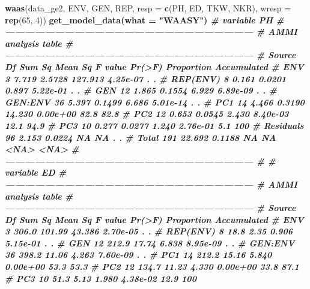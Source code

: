 \documentclass[
]{book}
\newenvironment{Shaded}{\begin{snugshade}}{\end{snugshade}}
\newcommand{\CommentTok}[1]{\textcolor[rgb]{0.56,0.35,0.01}{\textit{#1}}}
\newcommand{\DataTypeTok}[1]{\textcolor[rgb]{0.13,0.29,0.53}{#1}}
\newcommand{\DecValTok}[1]{\textcolor[rgb]{0.00,0.00,0.81}{#1}}
\newcommand{\KeywordTok}[1]{\textcolor[rgb]{0.13,0.29,0.53}{\textbf{#1}}}
\newcommand{\NormalTok}[1]{#1}
\newcommand{\OperatorTok}[1]{\textcolor[rgb]{0.81,0.36,0.00}{\textbf{#1}}}
\newcommand{\StringTok}[1]{\textcolor[rgb]{0.31,0.60,0.02}{#1}}
\begin{document}
\begin{Shaded}
\begin{Highlighting}[]
\KeywordTok{waas}\NormalTok{(data_ge2, ENV, GEN, REP,}
     \DataTypeTok{resp =} \KeywordTok{c}\NormalTok{(PH, ED, TKW, NKR),}
     \DataTypeTok{wresp =} \KeywordTok{rep}\NormalTok{(}\DecValTok{65}\NormalTok{, }\DecValTok{4}\NormalTok{)) }\OperatorTok{%
\StringTok{ }\KeywordTok{get_model_data}\NormalTok{(}\DataTypeTok{what =} \StringTok{"WAASY"}\NormalTok{)}
\CommentTok{# variable PH }
\CommentTok{# ---------------------------------------------------------------------------}
\CommentTok{# AMMI analysis table}
\CommentTok{# ---------------------------------------------------------------------------}
\CommentTok{#     Source  Df Sum Sq Mean Sq F value   Pr(>F) Proportion Accumulated}
\CommentTok{#        ENV   3  7.719  2.5728 127.913 4.25e-07          .           .}
\CommentTok{#   REP(ENV)   8  0.161  0.0201   0.897 5.22e-01          .           .}
\CommentTok{#        GEN  12  1.865  0.1554   6.929 6.89e-09          .           .}
\CommentTok{#    GEN:ENV  36  5.397  0.1499   6.686 5.01e-14          .           .}
\CommentTok{#        PC1  14  4.466  0.3190  14.230 0.00e+00       82.8        82.8}
\CommentTok{#        PC2  12  0.653  0.0545   2.430 8.40e-03       12.1        94.9}
\CommentTok{#        PC3  10  0.277  0.0277   1.240 2.76e-01        5.1         100}
\CommentTok{#  Residuals  96  2.153  0.0224      NA       NA          .           .}
\CommentTok{#      Total 191 22.692  0.1188      NA       NA       <NA>        <NA>}
\CommentTok{# ---------------------------------------------------------------------------}
\CommentTok{# }
\CommentTok{# variable ED }
\CommentTok{# ---------------------------------------------------------------------------}
\CommentTok{# AMMI analysis table}
\CommentTok{# ---------------------------------------------------------------------------}
\CommentTok{#     Source  Df Sum Sq Mean Sq F value   Pr(>F) Proportion Accumulated}
\CommentTok{#        ENV   3  306.0  101.99  43.386 2.70e-05          .           .}
\CommentTok{#   REP(ENV)   8   18.8    2.35   0.906 5.15e-01          .           .}
\CommentTok{#        GEN  12  212.9   17.74   6.838 8.95e-09          .           .}
\CommentTok{#    GEN:ENV  36  398.2   11.06   4.263 7.60e-09          .           .}
\CommentTok{#        PC1  14  212.2   15.16   5.840 0.00e+00       53.3        53.3}
\CommentTok{#        PC2  12  134.7   11.23   4.330 0.00e+00       33.8        87.1}
\CommentTok{#        PC3  10   51.3    5.13   1.980 4.38e-02       12.9         100}
}
\end{Highlighting}
\end{Shaded}
\end{document}
